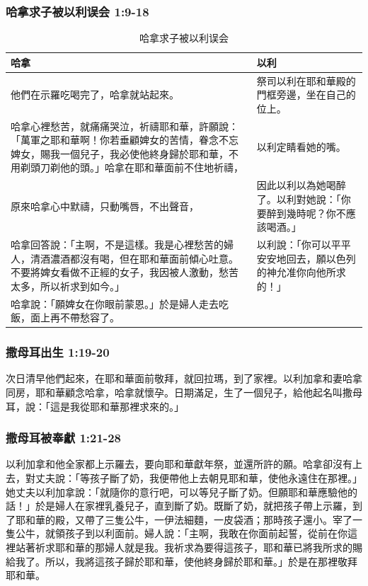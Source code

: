 \subsubsection{哈拿求子被以利误会 1:9-18}
\begin{table}[H]
\centering
\begin{tabular}{p{11.2cm}|p{}}\hline
哈拿&以利\\\hline
他們在示羅吃喝完了，哈拿就站起來。&祭司以利在耶和華殿的門框旁邊，坐在自己的位上。\\\hline
哈拿心裡愁苦，就痛痛哭泣，祈禱耶和華，許願說：「萬軍之耶和華啊！你若垂顧婢女的苦情，眷念不忘婢女，賜我一個兒子，我必使他終身歸於耶和華，不用剃頭刀剃他的頭。」哈拿在耶和華面前不住地祈禱，&以利定睛看她的嘴。 \\\hline
原來哈拿心中默禱，只動嘴唇，不出聲音，&因此以利以為她喝醉了。以利對她說：「你要醉到幾時呢？你不應該喝酒。」\\\hline
哈拿回答說：「主啊，不是這樣。我是心裡愁苦的婦人，清酒濃酒都沒有喝，但在耶和華面前傾心吐意。不要將婢女看做不正經的女子，我因被人激動，愁苦太多，所以祈求到如今。」 &以利說：「你可以平平安安地回去，願以色列的神允准你向他所求的！」\\\hline
哈拿說：「願婢女在你眼前蒙恩。」於是婦人走去吃飯，面上再不帶愁容了。 &\\\hline
\end{tabular}
\caption{哈拿求子被以利误会}
\end{table}  
 
\subsubsection{撒母耳出生 1:19-20}
次日清早他們起來，在耶和華面前敬拜，就回拉瑪，到了家裡。以利加拿和妻哈拿同房，耶和華顧念哈拿，哈拿就懷孕。日期滿足，生了一個兒子，給他起名叫撒母耳，說：「這是我從耶和華那裡求來的。」

\subsubsection{撒母耳被奉獻 1:21-28}
以利加拿和他全家都上示羅去，要向耶和華獻年祭，並還所許的願。哈拿卻沒有上去，對丈夫說：「等孩子斷了奶，我便帶他上去朝見耶和華，使他永遠住在那裡。」她丈夫以利加拿說：「就隨你的意行吧，可以等兒子斷了奶。但願耶和華應驗他的話！」於是婦人在家裡乳養兒子，直到斷了奶。既斷了奶，就把孩子帶上示羅，到了耶和華的殿，又帶了三隻公牛，一伊法細麵，一皮袋酒；那時孩子還小。宰了一隻公牛，就領孩子到以利面前。婦人說：「主啊，我敢在你面前起誓，從前在你這裡站著祈求耶和華的那婦人就是我。我祈求為要得這孩子，耶和華已將我所求的賜給我了。所以，我將這孩子歸於耶和華，使他終身歸於耶和華。」於是在那裡敬拜耶和華。

